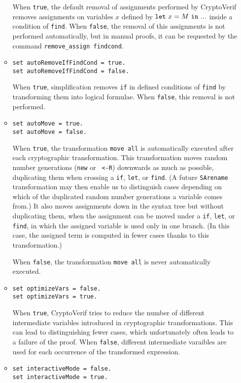 \begin{itemize}
\begin{itemize}
When {\tt true}, the default removal of assignments performed by
CryptoVerif removes assignments on variables $x$ defined by
${\tt let}\ x = M\ {\tt in}\ ...$ inside a condition of {\tt find}.
When {\tt false}, the removal of this assignments is not
performed automatically, but in manual proofs, it can be requested 
by the command {\tt remove\string_assign\ findcond}.

\item \texttt{set autoRemoveIfFindCond = true.}\\
\texttt{set autoRemoveIfFindCond = false.}

When {\tt true}, simplification removes {\tt if} in defined conditions
of {\tt find} by transforming them into logical formulae.
When {\tt false}, this removal is not performed.

\item \texttt{set autoMove = true.}\\
\texttt{set autoMove = false.}

When {\tt true}, the transformation {\tt move all} is automatically
executed after each cryptographic transformation. This transformation
moves random number generations ({\tt new} or {\tt
<-R}) downwards as much as possible, duplicating them when crossing
a {\tt if}, {\tt let}, or {\tt find}.  (A future {\tt SArename}
transformation may then enable us to distinguish cases depending on
which of the duplicated random number generations a variable comes
from.)  It also moves assignments down in the syntax tree but without
duplicating them, when the assignment can be moved under a {\tt if},
{\tt let}, or {\tt find}, in which the assigned variable is used
only in one branch. (In this case, the assigned term is computed in
fewer cases thanks to this transformation.)

When {\tt false}, the transformation {\tt move all} is never
automatically executed.

\item \texttt{set optimizeVars = false.}\\
\texttt{set optimizeVars = true.}

When {\tt true}, CryptoVerif tries to reduce the number of different
intermediate variables introduced in cryptographic
transformations. This can lead to distinguishing fewer cases,
which unfortunately often leads to a failure of the proof.
When {\tt false}, different intermediate varaibles are used for
each occurrence of the transformed expression.

\item \texttt{set interactiveMode = false.}\\
\texttt{set interactiveMode = true.}


\end{itemize}
\end{itemize}
